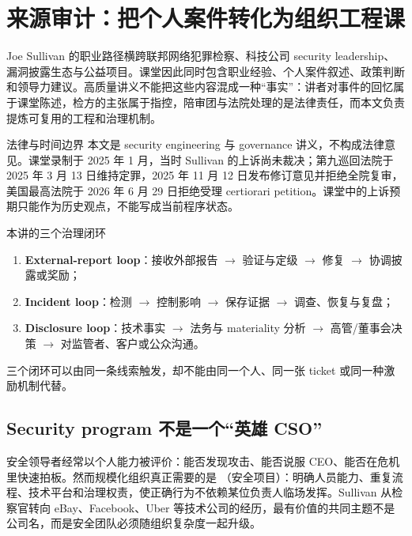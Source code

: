 \section{来源审计：把个人案件转化为组织工程课}

Joe Sullivan 的职业路径横跨联邦网络犯罪检察、科技公司 security leadership、漏洞披露生态与公益项目。课堂因此同时包含职业经验、个人案件叙述、政策判断和领导力建议。高质量讲义不能把这些内容混成一种“事实”：讲者对事件的回忆属于课堂陈述，检方的主张属于指控，陪审团与法院处理的是法律责任，而本文负责提炼可复用的工程和治理机制。

\begin{warningbox}{法律与时间边界}
本文是 security engineering 与 governance 讲义，不构成法律意见。课堂录制于 2025 年 1 月，当时 Sullivan 的上诉尚未裁决；第九巡回法院于 2025 年 3 月 13 日维持定罪，2025 年 11 月 12 日发布修订意见并拒绝全院复审，美国最高法院于 2026 年 6 月 29 日拒绝受理 certiorari petition。课堂中的上诉预期只能作为历史观点，不能写成当前程序状态。
\end{warningbox}

\begin{importantbox}{本讲的三个治理闭环}
\begin{enumerate}
  \item \textbf{External-report loop}：接收外部报告 $\rightarrow$ 验证与定级 $\rightarrow$ 修复 $\rightarrow$ 协调披露或奖励；
  \item \textbf{Incident loop}：检测 $\rightarrow$ 控制影响 $\rightarrow$ 保存证据 $\rightarrow$ 调查、恢复与复盘；
  \item \textbf{Disclosure loop}：技术事实 $\rightarrow$ 法务与 materiality 分析 $\rightarrow$ 高管/董事会决策 $\rightarrow$ 对监管者、客户或公众沟通。
\end{enumerate}
三个闭环可以由同一条线索触发，却不能由同一个人、同一张 ticket 或同一种激励机制代替。
\end{importantbox}

\subsection{Security program 不是一个“英雄 CSO”}

安全领导者经常以个人能力被评价：能否发现攻击、能否说服 CEO、能否在危机里快速拍板。然而规模化组织真正需要的是 （安全项目）：明确人员能力、重复流程、技术平台和治理权责，使正确行为不依赖某位负责人临场发挥。Sullivan 从检察官转向 eBay、Facebook、Uber 等技术公司的经历，最有价值的共同主题不是公司名，而是安全团队必须随组织复杂度一起升级。

